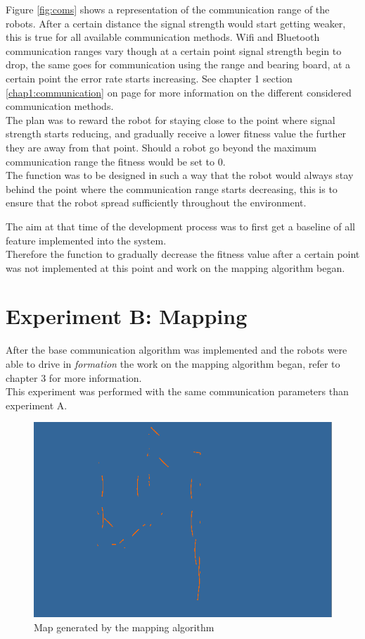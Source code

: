 Figure \ref{fig:coms} shows a representation of the communication range of the robots. After a certain distance the signal strength would start getting weaker, this is true for all available communication methods. Wifi and Bluetooth communication ranges vary though at a certain point signal strength begin to drop, the same goes for communication using the range and bearing board, at a certain point the error rate starts increasing. See chapter 1 section \ref{chap1:communication} on page \pageref{chap1:communication} for more information on the different considered communication methods. \\

The plan was to reward the robot for staying close to the point where signal strength starts reducing, and gradually receive a lower fitness value the further they are away from that point. Should a robot go beyond the maximum communication range the fitness would be set to 0. \\
The function was to be designed in such a way that the robot would always stay behind the point where the communication range starts decreasing, this is to ensure that the robot spread sufficiently throughout the environment. 

The aim at that time of the development process was to first get a baseline of all feature implemented into the system.\\
Therefore the function to gradually decrease the fitness value after a certain point was not implemented at this point and work on the mapping algorithm began.

\section{Experiment B: Mapping}
After the base  communication algorithm was implemented and the robots were able to drive in \textit{formation} the work on the mapping algorithm began, refer to chapter 3 for more information. \\

This experiment was performed with the same communication parameters than experiment A. \\

\begin{figure}[h]
\centering
\includegraphics[scale=0.5]{Chapter4/images/map1.png}
\caption{Map generated by the mapping algorithm}
\label{fig:map1}
\end{figure}

